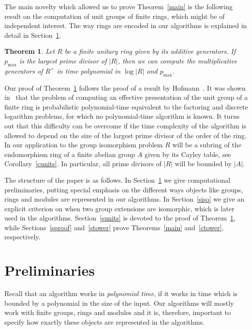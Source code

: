 \documentclass{article}
\newtheorem{theorem}{Theorem}[section]
\begin{document}
The main novelty which allowed us to prove Theorem~\ref{main} is the following result on the computation of unit groups of finite rings,
which might be of independent interest. The way rings are encoded in our algorithms is explained in detail in Section~\ref{sprem}.

\begin{theorem}\label{units}
	Let \( R \) be a finite unitary ring given by its additive generators.
	If \( p_{\max} \) is the largest prime divisor of \( |R| \),
	then we can compute the multiplicative generators of \( R^\times \) in time polynomial in \( \log |R| \) and \( p_{\max} \).
\end{theorem}

Our proof of Theorem~\ref{units} follows the proof of a result by Hofmann~\cite{hofmann}. It was shown in~\cite[Theorem~A]{hofmann}
that the problem of computing an effective presentation of the unit group of a finite ring is probabilistic polynomial-time equivalent to the factoring
and discrete logarithm problems, for which no polynomial-time algorithm is known.
It turns out that this difficulty can be overcome if the time complexity of the algorithm is allowed to depend on the
size of the largest prime divisor of the order of the ring. In our application to the group isomorphism problem
\( R \) will be a subring of the endomorphism ring of a finite abelian group \( A \) given by its Cayley table, see Corollary~\ref{cunits}.
In particular, all prime divisors of \( |R| \) will be bounded by \( |A| \).

The structure of the paper is as follows. In Section~\ref{sprem} we give computational preliminaries, putting
special emphasis on the different ways objects like groups, rings and modules are represented in our algorithms.
In Section~\ref{siso} we give an explicit criterion on when two group extensions are isomorphic, which is later used in the algorithms.
Section~\ref{sunits} is devoted to the proof of Theorem~\ref{units}, while Sections~\ref{sproof} and~\ref{stower} prove Theorems~\ref{main} and~\ref{ctower}, respectively.

\section{Preliminaries}\label{sprem}

Recall that an algorithm works in \emph{polynomial time}, if it works in time which is bounded by a polynomial in the size of the input.
Our algorithms will mostly work with finite groups, rings and modules and it is, therefore, important to specify how exactly these objects
are represented in the algorithms.
\end{document}
